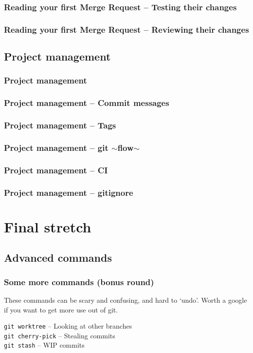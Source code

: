 \documentclass{beamer}
\begin{document}
\begin{frame}[fragile]
  \frametitle{Reading your first Merge Request -- Testing their changes}
\end{frame}

\begin{frame}[fragile]
  \frametitle{Reading your first Merge Request -- Reviewing their changes}  %
\end{frame}

\subsection{Project management}

\begin{frame}[fragile]
  \frametitle{Project management}
\end{frame}

\begin{frame}[fragile]
  \frametitle{Project management -- Commit messages}
\end{frame}

\begin{frame}[fragile]
  \frametitle{Project management -- Tags}
\end{frame}

\begin{frame}[fragile]
  \frametitle{Project management -- git $\sim$flow$\sim$}
\end{frame}

\begin{frame}[fragile]
  \frametitle{Project management -- CI} %
\end{frame}

\begin{frame}[fragile]
  \frametitle{Project management -- gitignore}
\end{frame}

\section{Final stretch}
\subsection{Advanced commands}

\begin{frame}[fragile]
  \frametitle{Some more commands (bonus round)}
  These commands can be scary and confusing, and hard to `undo'. Worth a google if you
  want to get more use out of git.
  \vspace{1em}
  
  \texttt{git worktree} -- Looking at other branches \\
  \texttt{git cherry-pick} -- Stealing commits \\
  \texttt{git stash} -- WIP commits \\
    
\end{frame}
\end{document}
